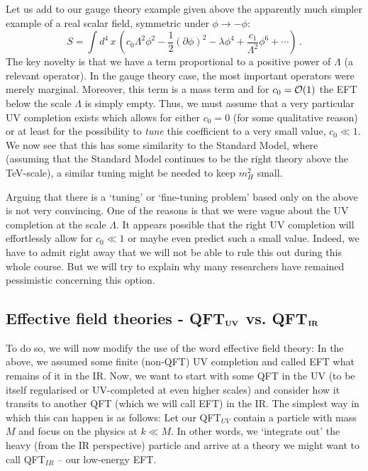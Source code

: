 \documentclass[12pt]{article}
\newcommand{\be}{\begin{equation}}
\newcommand{\ee}{\end{equation}}
\numberwithin{equation}{section}
\begin{document}
Let us add to our gauge theory example given above the apparently much simpler example of a real scalar field, symmetric under $\phi\to -\phi$:
\be
S=\int d^4\,x\,\left(c_0\Lambda^2\phi^2-\frac{1}{2}(\partial\phi)^2- \lambda\phi^4+\frac{c_1}{\Lambda^2}\phi^6+\cdots\right)\,.
\ee
The key novelty is that we have a term proportional to a positive power of $\Lambda$ (a relevant operator). In the gauge theory case, the most important operators were merely marginal. Moreover, this term is a mass term and for $c_0={\cal O}(1)$ the EFT below the scale $\Lambda$ is simply empty. Thus, we must assume that a very particular UV completion exists which allows for either $c_0=0$ (for some qualitative reason) or at least for the possibility to {\it tune} this coefficient to a very small value, $c_0\ll 1$. We now see that this has some similarity to the Standard Model, where (assuming that the Standard Model continues to be the right theory above the TeV-scale), a similar tuning might be needed to keep $m_H^2$ small. 

Arguing that there is a `tuning' or `fine-tuning problem' based only on the above is not very convincing. One of the reasons is that we were vague about the UV completion at the scale $\Lambda$. It appears possible that the right UV completion will effortlessly allow for $c_0\ll 1$ or maybe even predict such a small value. Indeed, we have to admit right away that we will not be able to rule this out during this whole course. But we will try to explain why many researchers have remained pessimistic concerning this option. 







\subsection{Effective field theories - QFT$_{\bf UV}$ vs. QFT$_{\bf IR}$}  

To do so, we will now modify the use of the word effective field theory: In the above, we assumed some finite (non-QFT) UV completion and called EFT what remains of it in the IR. Now, we want to start with some QFT in the UV (to be itself regularised or UV-completed at even higher scales) and consider how it transits to another QFT (which we will call EFT) in the IR. The simplest way in which this can happen is as follows: Let our QFT$_{UV}$ contain a particle with mass $M$ and focus on the physics at $k\ll M$. In other words, we `integrate out' the heavy (from the IR perspective) particle and arrive at a theory we might want to call QFT$_{IR}$ -- our low-energy EFT. 
\end{document}
